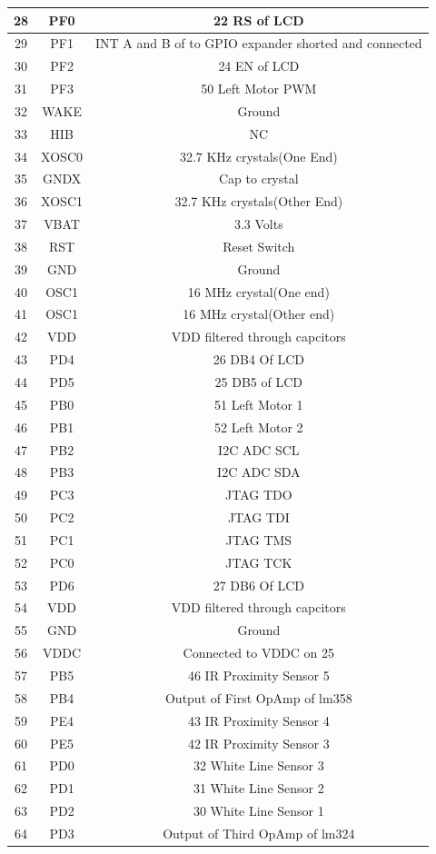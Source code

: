 \documentclass[a4paper,12pt,oneside]{article}
\begin{document}
{\begin{longtable}{|c|c|c|}
				28 &	PF0	 &	22 RS of LCD\\ \hline
				29 &	PF1	 &	INT A and B of to GPIO expander shorted and connected\\ \hline
				30 &	PF2 &	24 EN of LCD\\ \hline
				31 &	PF3	 &	50 Left Motor PWM\\ \hline
				32 &	WAKE &	Ground\\ \hline
				33 &	HIB &	NC\\ \hline
				34 &	XOSC0 &	32.7 KHz crystals(One End)\\ \hline
				35 &	GNDX &	Cap to crystal\\ \hline
				36 &	XOSC1 &	32.7 KHz crystals(Other End)\\  \hline
				37 &	VBAT &	3.3 Volts\\ \hline
				38 &	RST	 &	Reset Switch\\ \hline
				39 &	GND	 &	Ground\\ \hline
				40 &	OSC1 &	16 MHz crystal(One end)\\ \hline
				41 &	OSC1 &	16 MHz crystal(Other end)\\ \hline
				42 &	VDD	 &	VDD filtered through capcitors\\ \hline
				43 &	PD4	 &	26 DB4 Of LCD \\ \hline
				44 &	PD5	 &	25 DB5 of LCD\\ \hline
				45 &	PB0	 &	51 Left Motor 1\\ \hline
				46 &	PB1	 &	52 Left Motor 2\\ \hline
				47 &	PB2	 &	I2C ADC SCL\\ \hline 
				48 &	PB3	 &	I2C ADC SDA\\ \hline
				49 &	PC3	 &	JTAG TDO\\ \hline
				50 &	PC2	 &	JTAG TDI\\ \hline
				51 &	PC1	 &	JTAG TMS\\ \hline
				52 &	PC0	 &	JTAG TCK\\ \hline
				53 &	PD6	 &	27 DB6 Of LCD\\ \hline
				54 &	VDD	 &	VDD filtered through capcitors\\ \hline
				55 &	GND	 &	Ground\\ \hline
				56 &	VDDC &	Connected to VDDC on 25\\ \hline
				57 &	PB5	 &	46 IR Proximity Sensor 5\\ \hline
				58 &	PB4	 &	Output of First OpAmp of lm358\\ \hline
				59 &	PE4	 &	43 IR Proximity Sensor 4\\ \hline
				60 &	PE5	 &	42 IR Proximity Sensor 3\\ \hline
				61 &	PD0	 &	32 White Line Sensor 3\\ \hline
				62 &	PD1	 &	31 White Line Sensor 2\\ \hline
				63 &	PD2	 &	30 White Line Sensor 1\\ \hline
				64 &	PD3	 &	Output of Third OpAmp of lm324\\ \hline
			\end{longtable}
}
\end{document}
